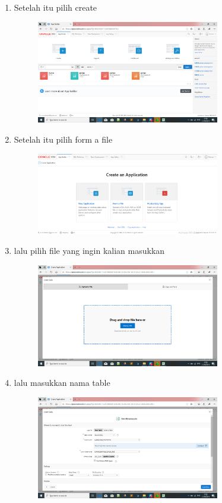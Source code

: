 \documentclass{article}
\begin{document}
\begin{enumerate}
\begin{figure}[h]
\end{figure}
  \item Setelah itu pilih create
    \begin{figure}[h]
  \centerline{\includegraphics[width=8cm]{figure/la.png}}
\end{figure}
     \item Setelah itu pilih form a file
    \begin{figure}[h]
   \centerline{\includegraphics[width=8cm]{figure/g.png}}
   \end{figure}
\newpage\item lalu pilih file yang ingin kalian masukkan
    \begin{figure}[h]
   \centerline{\includegraphics[width=8cm]{figure/li.png}}
\end{figure}
\newpage\item lalu masukkan nama table
    \begin{figure}[h]
   \centerline{\includegraphics[width=8cm]{figure/lo.png}}

\end{figure}
\end{enumerate}
\end{document}
